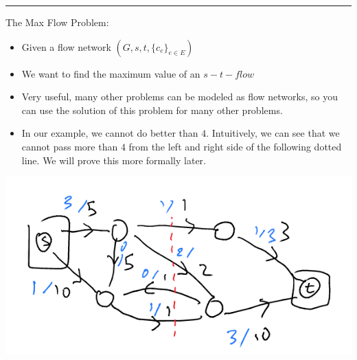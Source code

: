 \documentclass[11pt]{article}
\begin{document}
\noindent\rule{\textwidth}{0.5pt}
The Max Flow Problem:
\begin{itemize}
\item Given a flow network \((G,s,t,\{c_e\}_{e\in E})\)
\item We want to find the maximum value of an \(s-t-flow\)
\item Very useful, many other problems can be modeled as flow networks, so you can use the solution of this problem for many other problems.
\item In our example, we cannot do better than \(4\). Intuitively, we can see that we cannot pass more than \(4\) from the left and right side of the following dotted line. We will prove this more formally later.
\end{itemize}
\begin{center}
\includegraphics[width=.9\linewidth]{./Images/i106.png}
\end{center}
\end{document}
